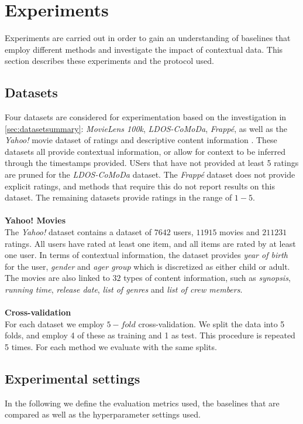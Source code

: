 \section{Experiments}
Experiments are carried out in order to gain an understanding of baselines that employ different methods and investigate the impact of contextual data.
This section describes these experiments and the protocol used.

\subsection{Datasets}
Four datasets are considered for experimentation based on the investigation in \autoref{sec:datasetsummary}: \textit{MovieLens 100k}, \textit{LDOS-CoMoDa}, \textit{Frappé}, as well as the \textit{Yahoo!} movie dataset of ratings and descriptive content information \cite{yahoo-movie}.
These datasets all provide contextual information, or allow for context to be inferred through the timestamps provided.
USers that have not provided at least 5 ratings are pruned for the \textit{LDOS-CoMoDa} dataset.
The \textit{Frappé} dataset does not provide explicit ratings, and methods that require this do not report results on this dataset.
The remaining datasets provide ratings in the range of $1-5$.
\\\\
\textbf{Yahoo! Movies}\\
The \textit{Yahoo!} dataset contains a dataset of $7642$ users, $11915$ movies and $211231$ ratings.
All users have rated at least one item, and all items are rated by at least one user.
In terms of contextual information, the dataset provides \textit{year of birth} for the user, \textit{gender} and \textit{ager group} which is discretized as either child or adult.
The movies are also linked to $32$ types of content information, such as \textit{synopsis}, \textit{running time}, \textit{release date}, \textit{list of genres} and \textit{list of crew members}.
\\\\
\textbf{Cross-validation}\\
For each dataset we employ $5-fold$ cross-validation.
We split the data into 5 folds, and employ 4 of these as training and 1 as test.
This procedure is repeated 5 times.
For each method we evaluate with the same splits.

\subsection{Experimental settings}
In the following we define the evaluation metrics used, the baselines that are compared as well as the hyperparameter settings used.
